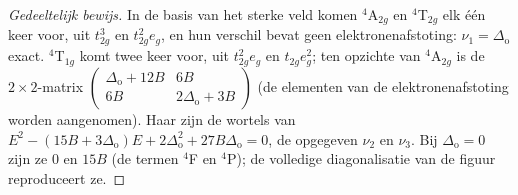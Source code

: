 \begin{proof}[Gedeeltelijk bewijs]
In de basis van het sterke veld komen $^4$A$_{2g}$ en $^4$T$_{2g}$ elk één keer voor, uit $t_{2g}^3$ en $t_{2g}^2e_g$, en
hun verschil bevat geen elektronenafstoting: $\nu_1 = \Delta_{\mathrm o}$ exact. $^4$T$_{1g}$ komt
twee keer voor, uit $t_{2g}^2e_g$ en $t_{2g}e_g^2$; ten opzichte van $^4$A$_{2g}$ is de $2\times2$-matrix
$\begin{pmatrix}\Delta_{\mathrm o} + 12B & 6B\\ 6B & 2\Delta_{\mathrm o} + 3B\end{pmatrix}$ (de elementen van de elektronenafstoting worden aangenomen).
Haar  zijn de wortels van $E^2 - (15B + 3\Delta_{\mathrm o})E + 2\Delta_{\mathrm o}^2 + 27B\Delta_{\mathrm o} = 0$, de opgegeven
$\nu_2$ en $\nu_3$. Bij $\Delta_{\mathrm o} = 0$ zijn ze 0 en $15B$ (de termen $^4$F en $^4$P); de volledige
diagonalisatie van de figuur reproduceert ze.
\end{proof}

